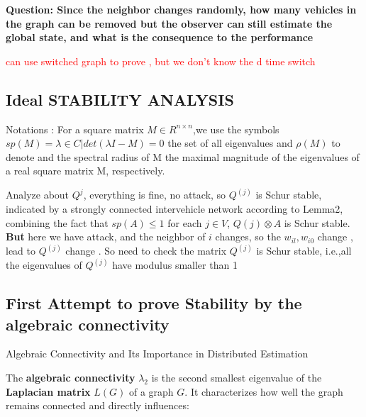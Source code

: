 \documentclass[letterpaper, 10pt, conference]{ieeeconf}  %
\begin{document}
\textbf{Question: Since the neighbor changes randomly, how many vehicles in the graph can be removed but the observer can still estimate the global state, and what is the consequence to the performance} 

\textcolor{red}{ can use switched graph to prove , but we don't know the  d time switch}

\subsection{Ideal STABILITY ANALYSIS}
Notations : For a square matrix $M \in R^{n\times n}$,we use the symbols $sp(M)={\lambda \in C|det (\lambda I - M ) = 0}$ the set of all eigenvalues and $ \rho(M)$ to denote and the spectral radius of M the maximal magnitude of the eigenvalues of a real square matrix M, respectively.

Analyze about $Q^{j}$, everything is fine, no attack, so $ Q^{(j)}$ is Schur stable, indicated by a strongly connected intervehicle network according to Lemma2, combining the fact that $sp(A) \leq 1 $ for each $j \in V$, $Q(j) \otimes A$ is Schur stable. 
\\ 

\textbf{But} here we have attack, and the neighbor of $i$ changes, so the $ w_{il} , w_{i 0}$ change , lead to $Q^{(j)}$ change . So need to check the matrix $Q^{(j)}$ is Schur stable, i.e.,all the eigenvalues of $Q^{(j)}$ have modulus smaller than 1

 \subsection{First Attempt to prove Stability by the algebraic connectivity  }
Algebraic Connectivity and Its Importance in Distributed Estimation \cite{algebraic_connectivity}

The \textbf{algebraic connectivity} \( \lambda_2 \) is the second smallest eigenvalue of the \textbf{Laplacian matrix} \( L(G) \) of a graph \( G \). It characterizes how well the graph remains connected and directly influences:
\end{document}
